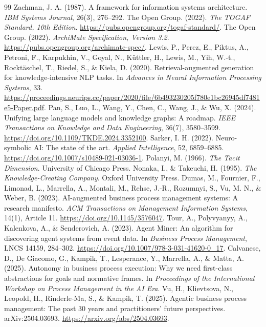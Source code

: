 \documentclass[11pt,letterpaper]{article}
\begin{document}
\begin{thebibliography}{99}
 Zachman, J. A. (1987). A framework for information systems architecture. \emph{IBM Systems Journal}, 26(3), 276--292.
 The Open Group. (2022). \emph{The TOGAF Standard, 10th Edition}. \url{https://pubs.opengroup.org/togaf-standard/}.
 The Open Group. (2022). \emph{ArchiMate Specification, Version 3.2}. \url{https://pubs.opengroup.org/archimate-spec/}.
 Lewis, P., Perez, E., Piktus, A., Petroni, F., Karpukhin, V., Goyal, N., K{\"u}ttler, H., Lewis, M., Yih, W.-t., Rockt{\"a}schel, T., Riedel, S., \& Kiela, D. (2020). Retrieval-augmented generation for knowledge-intensive NLP tasks. In \emph{Advances in Neural Information Processing Systems}, 33. \url{https://proceedings.neurips.cc/paper/2020/file/6b493230205f780e1bc26945df7481e5-Paper.pdf}.
 Pan, S., Luo, L., Wang, Y., Chen, C., Wang, J., \& Wu, X. (2024). Unifying large language models and knowledge graphs: A roadmap. \emph{IEEE Transactions on Knowledge and Data Engineering}, 36(7), 3580--3599. \url{https://doi.org/10.1109/TKDE.2024.3352100}.
 Sarker, I. H. (2022). Neuro-symbolic AI: The state of the art. \emph{Applied Intelligence}, 52, 6859--6885. \url{https://doi.org/10.1007/s10489-021-03036-1}.
 Polanyi, M. (1966). \emph{The Tacit Dimension}. University of Chicago Press.
 Nonaka, I., \& Takeuchi, H. (1995). \emph{The Knowledge-Creating Company}. Oxford University Press.
 Dumas, M., Fournier, F., Limonad, L., Marrella, A., Montali, M., Rehse, J.-R., Rozumnyi, S., Vu, M. N., \& Weber, B. (2023). AI-augmented business process management systems: A research manifesto. \emph{ACM Transactions on Management Information Systems}, 14(1), Article 11. \url{https://doi.org/10.1145/3576047}.
 Tour, A., Polyvyanyy, A., Kalenkova, A., \& Senderovich, A. (2023). Agent Miner: An algorithm for discovering agent systems from event data. In \emph{Business Process Management}, LNCS 14159, 284--302. \url{https://doi.org/10.1007/978-3-031-41620-0_17}.
 Calvanese, D., De Giacomo, G., Kampik, T., Lesperance, Y., Marrella, A., \& Matta, A. (2025). Autonomy in business process execution: Why we need first-class abstractions for goals and normative frames. In \emph{Proceedings of the International Workshop on Process Management in the AI Era}.
 Vu, H., Klievtsova, N., Leopold, H., Rinderle-Ma, S., \& Kampik, T. (2025). Agentic business process management: The past 30 years and practitioners' future perspectives. arXiv:2504.03693. \url{https://arxiv.org/abs/2504.03693}.

\end{thebibliography}
\end{document}
